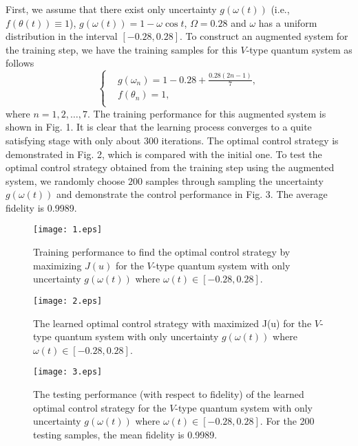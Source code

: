 \documentclass[letterpaper, 10 pt, conference]{ieeeconf}
\begin{document}
First, we assume that there exist only uncertainty $g(\omega(t))$ (i.e., $f(\theta(t))\equiv 1$), $g(\omega(t))=1-\omega \cos t$, $\Omega=0.28$ and $\omega$ has a uniform
distribution in the interval $[-0.28, 0.28]$. To construct an augmented system for the
training step, we have the training samples for
this $V$-type quantum system as follows
\begin{equation}
\left\{ \begin{split}
& g(\omega_{n})=1-0.28+\frac{0.28(2n-1)}{7},\\
& f(\theta_{n})=1, \\
\end{split}\right.
\end{equation}
where $n=1,2,\ldots,7$. The training
performance for this augmented system is shown in Fig. 1. It is
clear that the
learning process converges to a quite satisfying stage with only
about $300$ iterations. The optimal control strategy is
demonstrated in Fig. 2, which is compared with the initial one.
To test the optimal control strategy obtained from the training
step using the augmented system, we randomly choose $200$
samples through sampling the uncertainty $g(\omega(t))$ and demonstrate the control performance
in Fig. 3. The average fidelity is 0.9989.

\begin{figure}\label{fig1}
\centering
\texttt{[image: 1.eps]}
\caption{Training performance to find the optimal control
strategy by maximizing $J(u)$ for the $V$-type quantum system with
only uncertainty $g(\omega(t))$ where $\omega(t) \in [-0.28, 0.28]$.}
\end{figure}

\begin{figure}\label{fig2}
\centering
\texttt{[image: 2.eps]}
\caption{The learned optimal control strategy with maximized J(u)
for the $V$-type quantum system with
only uncertainty $g(\omega(t))$ where $\omega(t) \in [-0.28, 0.28]$.}
\end{figure}

\begin{figure*}\label{fig3}
\centering
\texttt{[image: 3.eps]}
\caption{The testing performance (with respect to fidelity) of the
learned optimal control strategy for the $V$-type quantum system with
only uncertainty $g(\omega(t))$ where $\omega(t) \in [-0.28, 0.28]$. For the 200 testing samples, the mean fidelity is 0.9989.}
\end{figure*}
\end{document}
